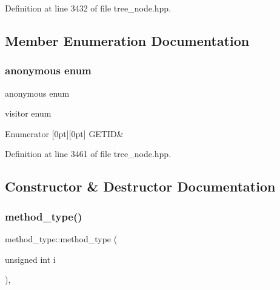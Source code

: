 Definition at line 3432 of file tree\+\_\+node.\+hpp.



\subsection{Member Enumeration Documentation}
\mbox{\label{structmethod__type_aa5c16c6f7cbcbbaf7b8f589729eb764a}} 
\subsubsection{\texorpdfstring{anonymous enum}{anonymous enum}}
{\footnotesize\ttfamily anonymous enum}



visitor enum 

\begin{DoxyEnumFields}{Enumerator}
[0pt][0pt]{}\mbox{\label{structmethod__type_aa5c16c6f7cbcbbaf7b8f589729eb764aae8a00184f06f382b459ee942c9ce29e2}} 
G\+E\+T\+ID&\\
\hline

\end{DoxyEnumFields}


Definition at line 3461 of file tree\+\_\+node.\+hpp.



\subsection{Constructor \& Destructor Documentation}
\mbox{\label{structmethod__type_a9db4c615cbce337c1047f702756b202d}} 
\subsubsection{\texorpdfstring{method\+\_\+type()}{method\_type()}}
{\footnotesize\ttfamily method\+\_\+type\+::method\+\_\+type (\begin{DoxyParamCaption}\item[{unsigned int}]{i }\end{DoxyParamCaption})\hspace{0.3cm}{\ttfamily [inline]}, {\ttfamily [explicit]}}



